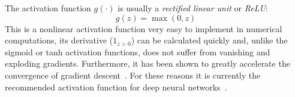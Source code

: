 The activation function $g(\cdot)$ is usually a \emph{rectified linear unit} or \emph{ReLU}:
\begin{equation}
	g(z) = \max(0,z)
\end{equation}
This is a nonlinear activation function very easy to implement in numerical computations, its derivative ($1_{z>0}$) can be calculated quickly and, unlike the sigmoid or tanh activation functions, does not suffer from vanishing and exploding gradients. Furthermore, it has been shown to greatly accelerate the convergence of gradient descent~\cite{Krizhevsky2012}. For these reasons it is currently the recommended activation function for deep neural networks~\cite{Karpathy2015}.

